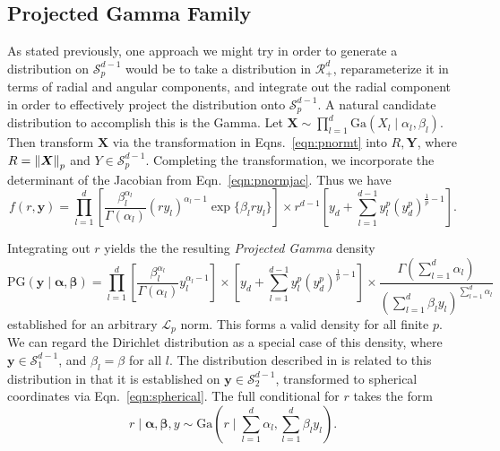 \subsection{Projected Gamma Family}
As stated previously, one approach we might try in order to generate a distribution on
  $\mathcal{S}_{p}^{d-1}$ would be to take a distribution in $\mathcal{R}_{+}^d$, reparameterize
  it in terms of radial and angular components, and integrate out the radial component in order to
  effectively project the distribution onto $\mathcal{S}_{p}^{d-1}$.  A natural candidate distribution
  to accomplish this is the Gamma.  Let $\bm{ X} \sim \prod_{l = 1}^d\text{Ga}\left(X_l\mid\alpha_l,\beta_l\right)$.
  Then transform $\bm{ X}$ via the transformation in Eqns.~\ref{eqn:pnormt} into $R,\bm{ Y}$, where
  $R = \left\lVert \bm{ X} \right\rVert_{p}$ and $Y\in \mathcal{S}_{p}^{d-1}$.  Completing the transformation, we
  incorporate the determinant of the Jacobian from Eqn.~\ref{eqn:pnormjac}.  Thus we have
  \begin{equation}
    \label{eqn:protopg}
    f(r,\bm{ y}) = \prod_{l = 1}^{d}
      \left[\frac{\beta_l^{\alpha_l}}{\Gamma(\alpha_l)}(ry_l)^{\alpha_l - 1}\exp\lbrace \beta_lry_l\rbrace\right]
      \times r^{d-1}\left[y_d + {\textstyle \sum}_{l = 1}^{d-1}y_l^p\left(y_d^p\right)^{\frac{1}{p} - 1}\right].
  \end{equation}

  Integrating out $r$ yields the the resulting \emph{Projected Gamma} density
  \begin{equation}
    \label{eqn:projgamma}
    \text{PG}(\bm{ y}\mid\bm{ \alpha},\bm{ \beta}) = \prod_{l = 1}^d\left[\frac{\beta_l^{\alpha_l}}{\Gamma(\alpha_l)}y_l^{\alpha_l - 1}\right]
      \times \left[y_d + {\textstyle \sum}_{l = 1}^{d-1}y_l^p\left(y_d^p\right)^{\frac{1}{p} - 1}\right]
      \times \frac{\Gamma({\textstyle\sum}_{l = 1}^d\alpha_l)}{\left({\textstyle\sum}_{l = 1}^d \beta_ly_l\right)^{{\textstyle\sum_{l = 1}^d \alpha_l}}}
  \end{equation}
  established for an arbitrary $\mathcal{L}_p$ norm. This forms a valid density for all finite $p$.
  We can regard the Dirichlet distribution as a special case of this density, where
  $\bm{ y}\in \mathcal{S}_1^{d-1}$, and $\beta_l = \beta$ for all $l$.  The distribution described
  in \cite{nunez2019} is related to this distribution in that it is established on
  $\bm{ y}\in \mathcal{S}_2^{d-1}$, transformed to spherical coordinates via Eqn.~\ref{eqn:spherical}.
  The full conditional for $r$ takes the form
  \begin{equation}
    \label{eqn:rfullcond}
    r\mid\bm{ \alpha},\bm{ \beta}, y \sim \text{Ga}\left(r\mid\sum_{l = 1}^d \alpha_l, \sum_{l = 1}^d \beta_ly_l\right).
  \end{equation}

